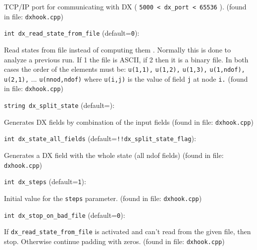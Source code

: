 TCP/IP port for communicating with DX ( \verb+5000 < dx_port < 65536+ ). 
 (found in file: \verb+dxhook.cpp+)
\item\verb+int dx_read_state_from_file+ {\rm(default=\verb|0|)}:

Read states from file instead of computing them . Normally
 this is done to analyze a previous run. If 1 the file is
 ASCII, if 2 then it is a binary file. In both cases the order
 of the elements must be: \verb+u(1,1),+ \verb+u(1,2),+ \verb+u(1,3),+
 \verb+u(1,ndof),+ \verb+u(2,1),+ ... \verb+u(nnod,ndof)+ where \verb+u(i,j)+ is
 the value of field \verb+j+ at node \verb+i.+ 
 (found in file: \verb+dxhook.cpp+)
\item\verb+string dx_split_state+ {\rm(default=\verb||)}:

Generates DX fields by combination of the input fields
 (found in file: \verb+dxhook.cpp+)
\item\verb+int dx_state_all_fields+ {\rm(default=\verb|!!dx_split_state_flag|)}:

Generates a DX field with the whole state (all ndof fields)
 (found in file: \verb+dxhook.cpp+)
\item\verb+int dx_steps+ {\rm(default=\verb|1|)}:

Initial value for the \verb+steps+ parameter. 
 (found in file: \verb+dxhook.cpp+)
\item\verb+int dx_stop_on_bad_file+ {\rm(default=\verb|0|)}:

If \verb+dx_read_state_from_file+ is activated and
 can't read from the given file, then stop.
 Otherwise continue padding with zeros. 
 (found in file: \verb+dxhook.cpp+)
